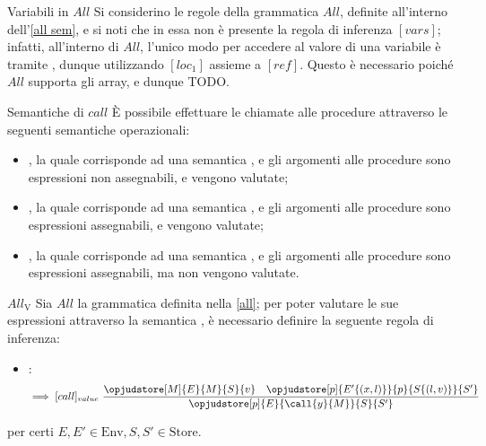 \documentclass[a4paper, 12pt]{report}
\begin{document}
    \begin{framedobs}{Variabili in $All$}
        Si considerino le regole della grammatica $All$, definite all'interno dell'\cref{all sem}, e si noti che in essa non è presente la regola di inferenza $[vars]$; infatti, all'interno di $All$, l'unico modo per accedere al valore di una variabile è tramite , dunque utilizzando $[loc_1]$ assieme a $[ref]$. Questo è necessario poiché $All$ supporta gli array, e dunque TODO.
    \end{framedobs}

    \begin{frameddefn}{Semantiche di $call$}
        È possibile effettuare le chiamate alle procedure attraverso le seguenti semantiche operazionali:

        \begin{itemize}
            \item {}, la quale corrisponde ad una semantica , e gli argomenti alle procedure sono espressioni non assegnabili, e vengono valutate;
            \item {}, la quale corrisponde ad una semantica , e gli argomenti alle procedure sono espressioni assegnabili, e vengono valutate;
            \item {}, la quale corrisponde ad una semantica , e gli argomenti alle procedure sono espressioni assegnabili, ma non vengono valutate.
        \end{itemize}
    \end{frameddefn}

    \begin{framedprop}[label={all v}]{$All_\mathrm{V}$}
        Sia $All$ la grammatica definita nella \cref{all}; per poter valutare le sue espressioni attraverso la semantica , è necessario definire la seguente regola di inferenza:

        \begin{itemize}
            \item {}:  $$\implies [call]_{value} \ \dfrac{\opjudstore[M]{E}{M}{S}{v} \quad \opjudstore[p]{E'\{(x,l)\}}{p}{S\{(l,v)\}}{S'}}{\opjudstore[p]{E}{\call{y}{M}}{S}{S'}}$$
        \end{itemize}

        per certi $E, E' \in \mathrm{Env}, S,S' \in \mathrm{Store}$.
    \end{framedprop}
\end{document}
